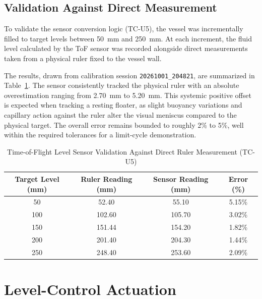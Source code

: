 \subsection{Validation Against Direct Measurement}
\label{subsec:proc-tof-test}

To validate the sensor conversion logic (TC-U5), the vessel was incrementally filled to target levels between 50~mm and 250~mm. At each increment, the fluid level calculated by the ToF sensor was recorded alongside direct measurements taken from a physical ruler fixed to the vessel wall. 

The results, drawn from calibration session \texttt{20261001\_204821}, are summarized in Table~\ref{tab:tof_validation}. The sensor consistently tracked the physical ruler with an absolute overestimation ranging from 2.70~mm to 5.20~mm. This systemic positive offset is expected when tracking a resting floater, as slight buoyancy variations and capillary action against the ruler alter the visual meniscus compared to the physical target. The overall error remains bounded to roughly 2\% to 5\%, well within the required tolerances for a limit-cycle demonstration.

\begin{table}[ht]
    \centering
    \caption{Time-of-Flight Level Sensor Validation Against Direct Ruler Measurement (TC-U5)}
    \label{tab:tof_validation}
    \begin{tabular}{cccc}
        \toprule
        \textbf{Target Level (mm)} & \textbf{Ruler Reading (mm)} & \textbf{Sensor Reading (mm)} & \textbf{Error (\%)} \\
        \midrule
        50  & 52.40  & 55.10  & 5.15\% \\
        100 & 102.60 & 105.70 & 3.02\% \\
        150 & 151.44 & 154.20 & 1.82\% \\
        200 & 201.40 & 204.30 & 1.44\% \\
        250 & 248.40 & 253.60 & 2.09\% \\
        \bottomrule
    \end{tabular}
\end{table}



\section{Level-Control Actuation}
\label{sec:proc-actuation}

